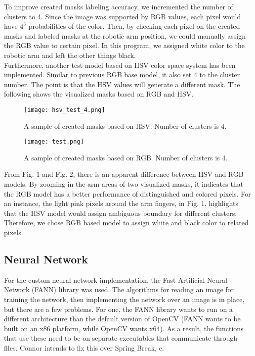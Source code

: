 \documentclass[10pt,journal,compsoc, draftclsnofoot,onecolumn]{IEEEtran}
\begin{document}
\noindent To improve created masks labeling accuracy, we incremented the number of clusters to 4. Since the image was supported by RGB values, each pixel would have $4^3$ probabilities of the color. Then, by checking each pixel on the created masks and labeled masks at the robotic arm position, we could manually assign the RGB value to certain pixel. In this program, we assigned white color to the robotic arm and left the other things black.
\\

\noindent Furthermore, another test model based on HSV color space system has been implemented. Similar to previous RGB base model, it also set 4 to the cluster number. The point is that the HSV values will generate a different mask. The following shows the visualized masks based on RGB and HSV.

\begin{figure}[H]
  \begin{center}
    \texttt{[image: hsv\_test\_4.png]}
  \end{center}
  \caption{A sample of created masks based on HSV. Number of clusters is 4.}
\end{figure}

\begin{figure}[H]
  \begin{center}
    \texttt{[image: test.png]}
  \end{center}
  \caption{A sample of created masks based on RGB. Number of clusters is 4.}
\end{figure}

\noindent From Fig. 1 and Fig. 2, there is an apparent difference between HSV and RGB models. By zooming in the arm areas of two visualized masks, it indicates that the RGB model has a better performance of distinguished and colored pixels. For an instance, the light pink pixels around the arm fingers, in Fig. 1, highlights that the HSV model would assign ambiguous boundary for different clusters. Therefore, we chose RGB based model to assign white and black color to related pixels. 

\subsection{Neural Network}
For the custom neural network implementation, the Fast Artificial Neural Network (FANN) library was used. The algorithms for reading an image for training the network, then implementing the network over an image is in place, but there are a few problems. For one, the FANN library wants to run on a different architecture than the default version of OpenCV (FANN wants to be built on an x86 platform, while OpenCV wants x64). As a result, the functions that use these need to be on separate executables that communicate through files. Connor intends to fix this over Spring Break, e.  
\end{document}
